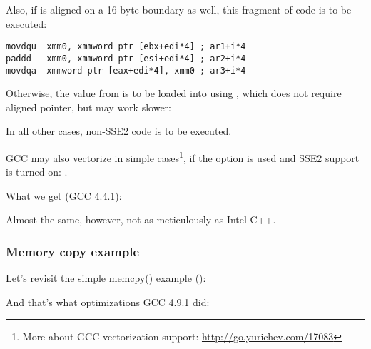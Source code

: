 Also, if  is aligned on a 16-byte boundary as well, 
this fragment of code is to be executed:

\begin{lstlisting}
movdqu  xmm0, xmmword ptr [ebx+edi*4] ; ar1+i*4
paddd   xmm0, xmmword ptr [esi+edi*4] ; ar2+i*4
movdqa  xmmword ptr [eax+edi*4], xmm0 ; ar3+i*4
\end{lstlisting}

Otherwise, the value from  is to be loaded into  using \MOVDQU,
which does not require aligned pointer, but may work slower:



In all other cases, non-SSE2 code is to be executed.


\newcommand{\URLGCCVEC}{\url{http://go.yurichev.com/17083}}

GCC may also vectorize in simple cases\footnote{More about GCC vectorization support: \URLGCCVEC},
if the \Othree option is used and SSE2 support is turned on: .

What we get (GCC 4.4.1):



Almost the same, however, not as meticulously as Intel C++.

\subsubsection{Memory copy example}
\label{vec_memcpy}

Let's revisit the simple memcpy() example
():



And that's what optimizations GCC 4.9.1 did:


